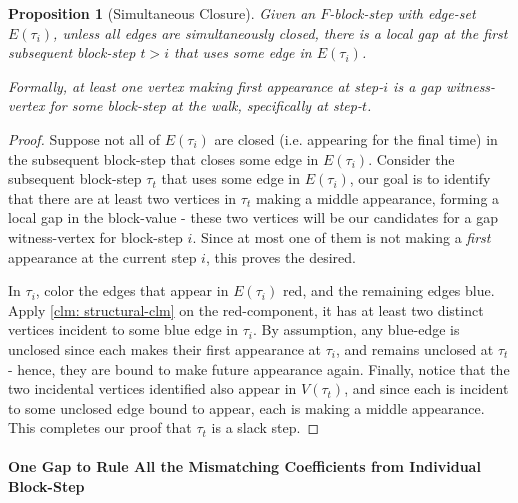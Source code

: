 \documentclass[12pt]{article}
\newtheorem{proposition}[theorem]{Proposition}
\begin{document}
\begin{proposition}[Simultaneous Closure]\label{prop:simul-closure}
	Given an $F$-block-step with edge-set $E(\tau_i)$, unless all edges are simultaneously closed, there is a local gap at the first subsequent block-step $t>i$ that uses some edge in $E(\tau_i)$. 
	
	Formally, at least one vertex making first appearance at step-$i$ is a gap witness-vertex for some block-step at the walk, specifically at step-$t$.
	\end{proposition}
\begin{proof}
	Suppose not all of $E(\tau_i)$ are closed (i.e. appearing for the final time) in the subsequent block-step that closes some edge in $E(\tau_i)$. Consider the subsequent block-step $\tau_t$ that uses some edge in $E(\tau_i)$, our goal is to identify that there are at least two vertices in $\tau_t$ making a middle appearance, forming a local gap in the block-value - these two vertices will be our candidates for a gap witness-vertex for block-step $i$. Since at most one of them is not making a \emph{first} appearance at the current step $i$, this proves the desired.
	
	In $\tau_i$, color the edges that appear in $E(\tau_i)$ red, and the remaining edges blue. Apply \cref{clm: structural-clm} on the red-component, it has at least two distinct vertices incident to some blue edge in $\tau_i$. By assumption, any blue-edge is unclosed since each makes their first appearance at $\tau_i$, and remains unclosed at $\tau_t$ - hence, they are bound to make future appearance again. Finally, notice that the two incidental vertices identified also appear in $V(\tau_t)$, and since each is incident to some unclosed edge bound to appear, each is making a middle appearance. This completes our proof that $\tau_t$ is a slack step.%
%	
%	
%	
	
\end{proof}


\paragraph{One Gap to Rule All the Mismatching Coefficients from Individual Block-Step }
\end{document}
